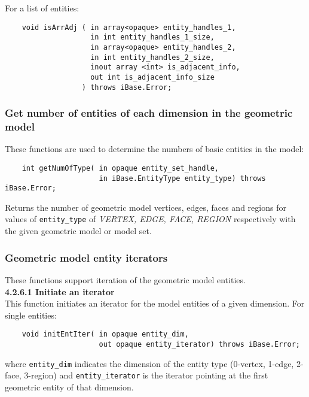 \documentclass{article}
\begin{document}
\hspace{-16pt}For a list of entities:

\begin{verbatim}
    void isArrAdj ( in array<opaque> entity_handles_1, 
                    in int entity_handles_1_size, 
                    in array<opaque> entity_handles_2, 
                    in int entity_handles_2_size, 
                    inout array <int> is_adjacent_info, 
                    out int is_adjacent_info_size
                  ) throws iBase.Error;
\end{verbatim}

\subsubsection{Get number of entities of each dimension in the geometric model}
These functions are used to determine the numbers of basic 
entities in the model:

\begin{verbatim}
    int getNumOfType( in opaque entity_set_handle, 
                      in iBase.EntityType entity_type) throws iBase.Error;
\end{verbatim}
Returns the number of geometric model vertices, edges, faces 
and regions for values of {\tt entity\_type} of \textit{VERTEX, EDGE, 
FACE, REGION} respectively with the given geometric model 
or model set.

\subsubsection{Geometric model entity iterators }
These functions support iteration of the geometric model 
entities.\\

\hspace{-16pt}\textbf{4.2.6.1 Initiate an iterator}\\

This function initiates an iterator for the model entities 
of a given dimension. For single entities:

\begin{verbatim}
    void initEntIter( in opaque entity_dim, 
                      out opaque entity_iterator) throws iBase.Error;
\end{verbatim}
where {\tt entity\_dim} indicates the dimension of the entity 
type (0-vertex, 1-edge, 2-face, 3-region) and {\tt entity\_iterator} is 
the iterator pointing at the first geometric entity of that dimension. \\
\end{document}
